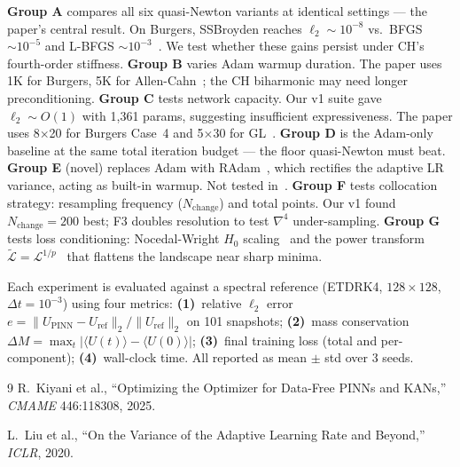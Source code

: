 \documentclass[11pt,a4paper]{article}
\begin{document}
\textbf{Group A} compares all six quasi-Newton variants at identical settings — the paper's central result. On Burgers, SSBroyden reaches $\ell_2\!\sim\!10^{-8}$ vs.\ BFGS ${\sim}10^{-5}$ and L-BFGS ${\sim}10^{-3}$~\cite[Tab.~2]{kiyani2025}. We test whether these gains persist under CH's fourth-order stiffness.
%
\textbf{Group B} varies Adam warmup duration. The paper uses 1K for Burgers, 5K for Allen-Cahn~\cite[Tab.~7]{kiyani2025}; the CH biharmonic may need longer preconditioning.
%
\textbf{Group C} tests network capacity. Our v1 suite gave $\ell_2\!\sim\!O(1)$ with 1,361 params, suggesting insufficient expressiveness. The paper uses 8$\times$20 for Burgers Case~4 and 5$\times$30 for GL~\cite[Tabs.~2,~10]{kiyani2025}.
%
\textbf{Group D} is the Adam-only baseline at the same total iteration budget — the floor quasi-Newton must beat.
%
\textbf{Group E} (novel) replaces Adam with RAdam~\cite{liu2020radam}, which rectifies the adaptive LR variance, acting as built-in warmup. Not tested in~\cite{kiyani2025}.
%
\textbf{Group F} tests collocation strategy: resampling frequency ($N_\text{change}$) and total points. Our v1 found $N_\text{change}\!=\!200$ best; F3 doubles resolution to test $\nabla^4$ under-sampling.
%
\textbf{Group G} tests loss conditioning: Nocedal-Wright $H_0$ scaling~\cite[Sec.~2.3]{kiyani2025} and the power transform $\tilde{\mathcal{L}}=\mathcal{L}^{1/p}$~\cite[Sec.~2.4]{kiyani2025} that flattens the landscape near sharp minima.

\vspace{0.5em}

Each experiment is evaluated against a spectral reference (ETDRK4, $128\!\times\!128$, $\Delta t\!=\!10^{-3}$) using four metrics:
\textbf{(1)}~relative $\ell_2$ error $e = \|U_\text{PINN} - U_\text{ref}\|_2 / \|U_\text{ref}\|_2$ on 101 snapshots;
\textbf{(2)}~mass conservation $\Delta M = \max_t |\langle U(t)\rangle - \langle U(0)\rangle|$;
\textbf{(3)}~final training loss (total and per-component);
\textbf{(4)}~wall-clock time.
All reported as mean $\pm$ std over 3 seeds.

\vspace{0.3em}
\renewcommand{\refname}{}
\begin{thebibliography}{9}
\vspace{-1.5em}
R.~Kiyani et al., ``Optimizing the Optimizer for Data-Free PINNs and KANs,''
\textit{CMAME} 446:118308, 2025.

L.~Liu et al., ``On the Variance of the Adaptive Learning Rate and Beyond,''
\textit{ICLR}, 2020.
\end{thebibliography}
\end{document}
